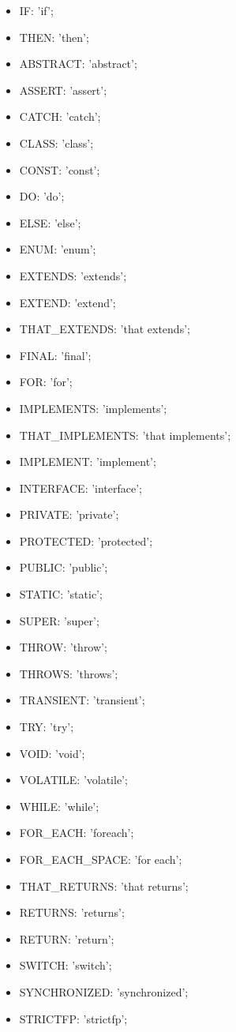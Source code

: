 \begin{itemize}
	\item IF: 'if';
	\item THEN: 'then';
	\item ABSTRACT: 'abstract';
	\item ASSERT: 'assert';
	\item CATCH: 'catch';
	\item CLASS: 'class';
	\item CONST: 'const';
	\item DO: 'do';
	\item ELSE: 'else';
	\item ENUM: 'enum';
	\item EXTENDS: 'extends';
	\item EXTEND: 'extend';
	\item THAT\_EXTENDS: 'that extends';
	\item FINAL: 'final';
	\item FOR: 'for';
	\item IMPLEMENTS: 'implements';
	\item THAT\_IMPLEMENTS: 'that implements';
	\item IMPLEMENT: 'implement';
	\item INTERFACE: 'interface';
	\item PRIVATE: 'private';
	\item PROTECTED: 'protected';
	\item PUBLIC: 'public';
	\item STATIC: 'static';
	\item SUPER: 'super';
	\item THROW: 'throw';
	\item THROWS: 'throws';
	\item TRANSIENT: 'transient';
	\item TRY: 'try';
	\item VOID: 'void';
	\item VOLATILE: 'volatile';
	\item WHILE: 'while';
	\item FOR\_EACH: 'foreach';
	\item FOR\_EACH\_SPACE: 'for each';
	\item THAT\_RETURNS: 'that returns';
	\item RETURNS: 'returns';
	\item RETURN: 'return';
	\item SWITCH: 'switch';
	\item SYNCHRONIZED: 'synchronized';
	\item STRICTFP: 'strictfp';

\end{itemize}
